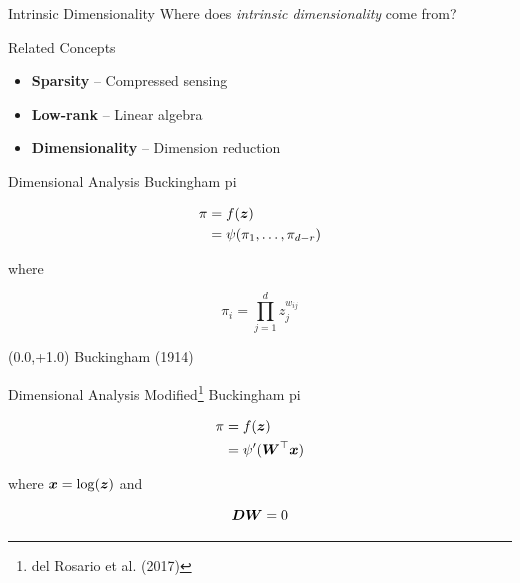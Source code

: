 \documentclass[14pt]{beamer}
\begin{document}
\begin{frame}{Intrinsic Dimensionality}
  \huge Where does \emph{intrinsic dimensionality} come from?
\end{frame}

\begin{frame}{Related Concepts}
  \begin{itemize}
  \item \textbf{Sparsity} -- Compressed sensing
  \item \textbf{Low-rank} -- Linear algebra
  \item \textbf{Dimensionality} -- Dimension reduction
  \end{itemize}
\end{frame}

\begin{frame}{Dimensional Analysis}
  Buckingham pi

  \begin{equation*} \begin{aligned}
      \pi &= f(\boldsymbol{z}) \\
          &= \psi(\pi_1,\dots,\pi_{d-r})
  \end{aligned} \end{equation*}

  where

  \begin{equation}
    \pi_i = \prod_{j=1}^d z_j^{w_{ij}}
  \end{equation}

  \begin{textblock}{5}(0.0,+1.0)
    {\tiny Buckingham (1914)}
  \end{textblock}
\end{frame}

\begin{frame}{Dimensional Analysis}
  \alert{Modified}\footnote{del Rosario et al. (2017)} Buckingham pi

  \begin{equation*} \begin{aligned}
      \pi &= f(\boldsymbol{z}) \\
          &= \psi'(\boldsymbol{W}^{\top}\boldsymbol{x})
  \end{aligned} \end{equation*}

  where $\boldsymbol{x} = \log(\boldsymbol{z})$ and

  \begin{equation}
    \boldsymbol{D}\boldsymbol{W} = 0
  \end{equation}

\end{frame}
\end{document}
